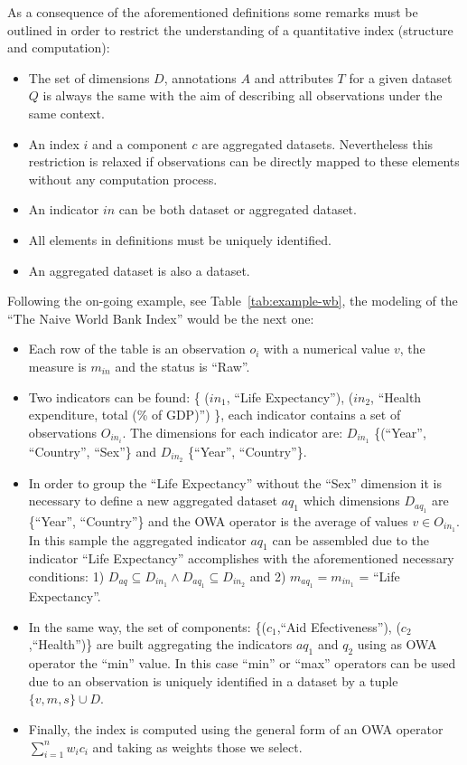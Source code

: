 As a consequence of the aforementioned definitions some remarks must be outlined in order to restrict the understanding of 
a quantitative index (structure and computation):
\begin{itemize}
 \item The set of dimensions $D$, annotations $A$ and attributes $T$ for a given dataset $Q$ is always the same with the aim of describing all observations under 
 the same context.
 \item An index $i$ and a component $c$ are aggregated datasets. Nevertheless this restriction is relaxed if observations can be directly mapped to 
 these elements without any computation process.
 \item An indicator $in$ can be both dataset or aggregated dataset.
 \item All elements in definitions must be uniquely identified. 
 \item An aggregated dataset is also a dataset.
\end{itemize}

Following the on-going example, see Table~\ref{tab:example-wb}, the modeling of the ``The Naive World Bank Index'' would be the next one:
\begin{itemize}
 \item Each row of the table is an observation $o_i$ with a numerical value $v$, the measure is $m_{in}$ and the status is ``Raw''.
 \item Two indicators can be found: \{ ($in_1$, ``Life Expectancy''), ($in_2$, ``Health expenditure, total (\% of GDP)'') \}, each indicator contains a set 
 of observations $O_{in_i}$. The dimensions for each indicator are: $D_{in_1}$  \{(``Year'', ``Country'', ``Sex''\} and $D_{in_2}$ \{``Year'', ``Country''\}.
 \item In order to group the ``Life Expectancy'' without the ``Sex'' dimension it is necessary to define a new aggregated dataset $aq_1$ which 
 dimensions $D_{aq_1}$ are \{``Year'', ``Country''\} and the OWA operator is the average of values $v \in O_{in_1}$. In this sample the aggregated indicator $aq_1$
 can be assembled due to the indicator ``Life Expectancy'' accomplishes with the aforementioned necessary conditions: 1) $D_{aq} \subseteq D_{in_1} \wedge D_{aq_1} \subseteq D_{in_2}$ and 
 2) $m_{aq_1}= m_{in_1}$ = ``Life Expectancy''.
 \item In the same way, the set of components: \{($c_1$,``Aid Efectiveness''), ($c_2$,``Health'')\} are built aggregating the indicators $aq_1$ and 
 $q_2$ using as OWA operator the ``min'' value. In this case ``min'' or ``max'' operators can be used due to an observation is uniquely identified in a 
 dataset by a tuple $\{v,m,s\} \cup D$.
 \item Finally, the index is computed using the general form of an OWA operator $\sum_{i=1}^n  w_i c_i$ and taking as weights those we select.
\end{itemize}

